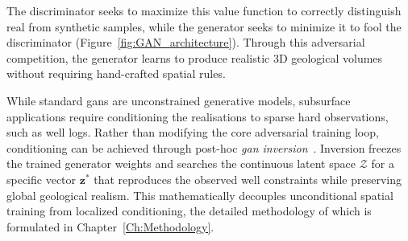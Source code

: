The discriminator seeks to maximize this value function to correctly distinguish real from synthetic samples, while the generator seeks to minimize it to fool the discriminator (Figure~\ref{fig:GAN_architecture}). Through this adversarial competition, the generator learns to produce realistic 3D geological volumes without requiring hand-crafted spatial rules. 

While standard \glspl{gan} are unconstrained generative models, subsurface applications require conditioning the realisations to sparse hard observations, such as well logs. Rather than modifying the core adversarial training loop, conditioning can be achieved through post-hoc \textit{\gls{gan} inversion}~\parencite{bhavsar2024stable, rongier2025btowards}. Inversion freezes the trained generator weights and searches the continuous latent space $\mathcal{Z}$ for a specific vector $\mathbf{z}^*$ that reproduces the observed well constraints while preserving global geological realism. This mathematically decouples unconditional spatial training from localized conditioning, the detailed methodology of which is formulated in Chapter~\ref{Ch:Methodology}. 